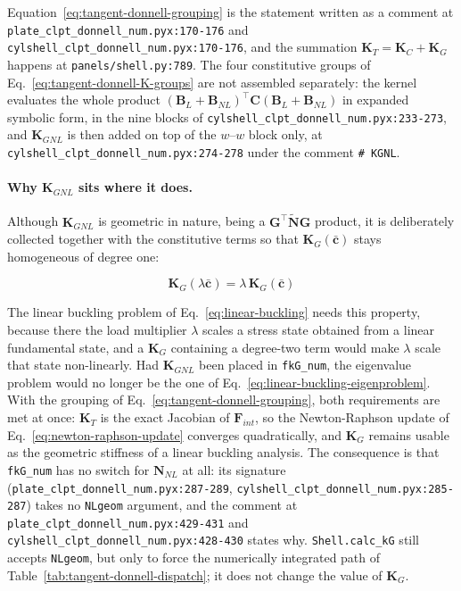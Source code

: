Equation~\ref{eq:tangent-donnell-grouping} is the statement written as a comment at \texttt{plate\_clpt\_donnell\_num.pyx:170-176} and \texttt{cylshell\_clpt\_donnell\_num.pyx:170-176}, and the summation $\boldsymbol{K}_T = \boldsymbol{K}_C + \boldsymbol{K}_G$ happens at \texttt{panels/shell.py:789}. The four constitutive groups of Eq.~\ref{eq:tangent-donnell-K-groups} are not assembled separately: the kernel evaluates the whole product $(\boldsymbol{B}_L + \boldsymbol{B}_{NL})^\top \boldsymbol{C} (\boldsymbol{B}_L + \boldsymbol{B}_{NL})$ in expanded symbolic form, in the nine blocks of \texttt{cylshell\_clpt\_donnell\_num.pyx:233-273}, and $\boldsymbol{K}_{GNL}$ is then added on top of the $w$--$w$ block only, at \texttt{cylshell\_clpt\_donnell\_num.pyx:274-278} under the comment \texttt{\# KGNL}.

\paragraph{Why $\boldsymbol{K}_{GNL}$ sits where it does.} Although $\boldsymbol{K}_{GNL}$ is geometric in nature, being a $\boldsymbol{G}^\top \tilde{\boldsymbol{N}} \boldsymbol{G}$ product, it is deliberately collected together with the constitutive terms so that $\boldsymbol{K}_G(\bar{\boldsymbol{c}})$ stays homogeneous of degree one:

\begin{equation*}
	\boldsymbol{K}_G(\lambda\bar{\boldsymbol{c}}) = \lambda\,\boldsymbol{K}_G(\bar{\boldsymbol{c}})
\end{equation*}

The linear buckling problem of Eq.~\ref{eq:linear-buckling} needs this property, because there the load multiplier $\lambda$ scales a stress state obtained from a linear fundamental state, and a $\boldsymbol{K}_G$ containing a degree-two term would make $\lambda$ scale that state non-linearly. Had $\boldsymbol{K}_{GNL}$ been placed in \texttt{fkG\_num}, the eigenvalue problem would no longer be the one of Eq.~\ref{eq:linear-buckling-eigenproblem}. With the grouping of Eq.~\ref{eq:tangent-donnell-grouping}, both requirements are met at once: $\boldsymbol{K}_T$ is the exact Jacobian of $\boldsymbol{F}_{int}$, so the Newton-Raphson update of Eq.~\ref{eq:newton-raphson-update} converges quadratically, and $\boldsymbol{K}_G$ remains usable as the geometric stiffness of a linear buckling analysis. The consequence is that \texttt{fkG\_num} has no switch for $\boldsymbol{N}_{NL}$ at all: its signature (\texttt{plate\_clpt\_donnell\_num.pyx:287-289}, \texttt{cylshell\_clpt\_donnell\_num.pyx:285-287}) takes no \texttt{NLgeom} argument, and the comment at \texttt{plate\_clpt\_donnell\_num.pyx:429-431} and \texttt{cylshell\_clpt\_donnell\_num.pyx:428-430} states why. \texttt{Shell.calc\_kG} still accepts \texttt{NLgeom}, but only to force the numerically integrated path of Table~\ref{tab:tangent-donnell-dispatch}; it does not change the value of $\boldsymbol{K}_G$.

